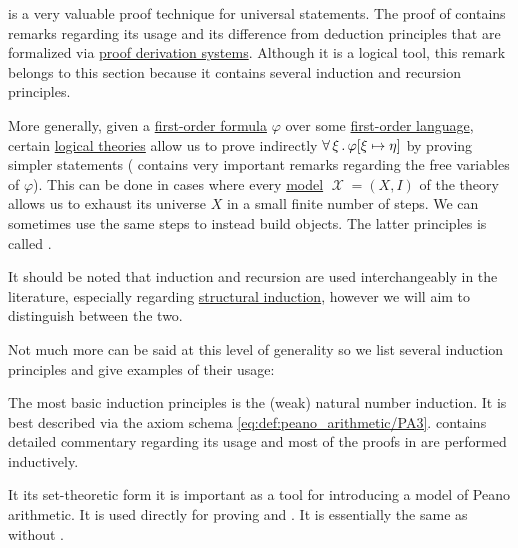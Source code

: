 \begin{remark}\label{rem:induction}
   is a very valuable proof technique for universal statements. The proof of  contains remarks regarding its usage and its difference from deduction principles that are formalized via \hyperref[def:proof_derivation_system]{proof derivation systems}. Although it is a logical tool, this remark belongs to this section because it contains several induction and recursion principles.

  More generally, given a \hyperref[def:first_order_formula]{first-order formula} \( \varphi \) over some \hyperref[def:first_order_syntax]{first-order language}, certain \hyperref[def:first_order_theory]{logical theories} allow us to prove indirectly \( \forall \thinspace \xi \thinspace . \thinspace \varphi[\xi \mapsto \eta] \) by proving simpler statements ( contains very important remarks regarding the free variables of \( \varphi \)). This can be done in cases where every \hyperref[def:first_order_semantics/satisfiability]{model} \( \mscrX = (X, I) \) of the theory allows us to exhaust its universe \( X \) in a small finite number of steps. We can sometimes use the same steps to instead build objects. The latter principles is called .

  It should be noted that induction and recursion are used interchangeably in the literature, especially regarding \hyperref[rem:structural_recursion_and_induction]{structural induction}, however we will aim to distinguish between the two.

  Not much more can be said at this level of generality so we list several induction principles and give examples of their usage:
  \begin{thmenum}
     The most basic induction principles is the (weak) natural number induction. It is best described via the axiom schema \eqref{eq:def:peano_arithmetic/PA3}.  contains detailed commentary regarding its usage and most of the proofs in  are performed inductively.

    It its set-theoretic form  it is important as a tool for introducing a model of Peano arithmetic. It is used directly for proving  and . It is essentially the same as  without .


\end{thmenum}
\end{remark}
